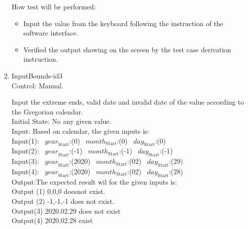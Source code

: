 \documentclass[12pt, titlepage]{article}
\begin{document}
\begin{enumerate}

How test will be performed:

\begin{itemize} 

\item Input the value from the keyboard following the instruction of the
software interface.
\item Verified the output showing on the screen by the test case derivation
instruction.
\end{itemize}
\item{InputBounds-id3\\}
Control: Manual. 
  
 Input the extreme ends, valid date and invalid date of the value according to the Gregorian calendar. \\
Initial State: No any given value.\\

Input: Based on calendar, the given inputs is:\\ 
Input(1):
~$\mathit{year}_\text{Start}$:(0) ~$\mathit{month}_\text{Start}$:(0)
~$\mathit{day}_\text{Start}$:(0)\\  
Input(2):
~$\mathit{year}_\text{Start}$:(-1)
~$\mathit{month}_\text{Start}$:(-1) ~$\mathit{day}_\text{Start}$:(-1)\\

Input(3):
~$\mathit{year}_\text{Start}$:(2020)
~$\mathit{month}_\text{Start}$:(02) ~$\mathit{day}_\text{Start}$:(29)\\

Input(4):
~$\mathit{year}_\text{Start}$:(2020)
~$\mathit{month}_\text{Start}$:(02) ~$\mathit{day}_\text{Start}$:(28)\\


Output:The expected result wil  for the given inputs is:\\
Output (1) 0,0,0 doesnot  exist.\\ 
Output (2) -1,-1,-1 does not exist.\\
 Output(3) 2020.02.29 does not exist\\ 
 Output(4) 2020.02.28 exist\\ 

 

\end{enumerate}
\end{document}
